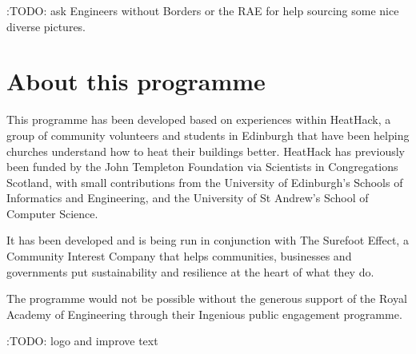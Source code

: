 \documentclass[letterpaper,10pt,english]{jupyterBook}
\let\sphinxpxdimen\pdfpxdimen\else\newdimen\sphinxpxdimen
\begin{document}
\sphinxAtStartPar
:TODO:  ask Engineers without Borders or the RAE for help sourcing some nice diverse pictures.


\chapter{About this programme}
\label{\detokenize{about:about-this-programme}}\label{\detokenize{about::doc}}
\sphinxAtStartPar
This programme has been developed based on experiences within HeatHack, a group of community volunteers and students in Edinburgh that have been helping churches understand how to heat their buildings better.  HeatHack has previously been funded by the John Templeton Foundation via Scientists in Congregations Scotland, with small contributions from the University of Edinburgh’s Schools of Informatics and Engineering, and the University of St Andrew’s School of Computer Science.

\sphinxAtStartPar
It has been developed and is being run in conjunction with The Surefoot Effect, a Community Interest Company that helps communities, businesses and governments put sustainability and resilience at the heart of what they do.

\sphinxAtStartPar
The programme would not be possible without the generous support of the Royal Academy of Engineering through their Ingenious public engagement programme.

\sphinxAtStartPar
:TODO: logo and improve text

\noindent{\sphinxincludegraphics[width=200\sphinxpxdimen]{{surefoot-logo}.png}\hspace*{\fill}}







\renewcommand{\indexname}{Index}
\printindex
\end{document}
